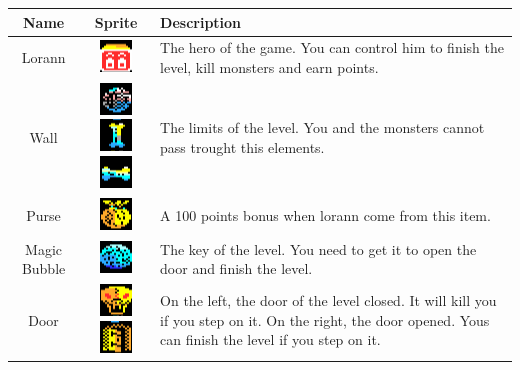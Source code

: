 \documentclass{report}
\begin{document}
\begin{center}
\begin{tabulary}{0.9\linewidth}{|c|c|L|}
\hline
Name & Sprite & Description \\
\hline
\hline
Lorann & \includegraphics[scale=0.7]{resources/sprites/lorann_b.png} & The hero of the game. You can control him to finish the level, kill monsters and earn points. \\
\hline
Wall & \includegraphics[scale=0.7]{resources/sprites/bone.png}\includegraphics[scale=0.7]{resources/sprites/vertical_bone.png}\includegraphics[scale=0.7]{resources/sprites/horizontal_bone.png} & The limits of the level. You and the monsters cannot pass trought this elements. \\
\hline
Purse & \includegraphics[scale=0.7]{resources/sprites/purse.png} & A 100 points bonus when lorann come from this item. \\
\hline
Magic Bubble & \includegraphics[scale=0.7]{resources/sprites/crystal_ball.png} & The key of the level. You need to get it to open the door and finish the level. \\
\hline
Door & \includegraphics[scale=0.7]{resources/sprites/gate_closed.png}\includegraphics[scale=0.7]{resources/sprites/gate_open.png} & On the left, the door of the level closed. It will kill you if you step on it. On the right, the door opened. Yous can finish the level if you step on it. \\

\end{tabulary}
\end{center}
\end{document}
